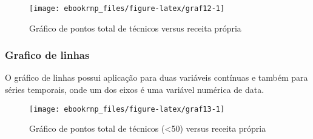 \documentclass[12pt,]{style/krantz}
\makeatletter
\newenvironment{Shaded}{\begin{snugshade}}{\end{snugshade}}
\newcommand{\KeywordTok}[1]{\textcolor[rgb]{0.13,0.29,0.53}{\textbf{#1}}}
\newcommand{\DataTypeTok}[1]{\textcolor[rgb]{0.13,0.29,0.53}{#1}}
\newcommand{\DecValTok}[1]{\textcolor[rgb]{0.00,0.00,0.81}{#1}}
\newcommand{\StringTok}[1]{\textcolor[rgb]{0.31,0.60,0.02}{#1}}
\newcommand{\OperatorTok}[1]{\textcolor[rgb]{0.81,0.36,0.00}{\textbf{#1}}}
\newcommand{\NormalTok}[1]{#1}
\newenvironment{kframe}{%
\medskip{}
\setlength{\fboxsep}{.8em}
 \def\at@end@of@kframe{}%
 \ifinner\ifhmode%
  \def\at@end@of@kframe{\end{minipage}}%
  \begin{minipage}{\columnwidth}%
 \fi\fi%
 \def\FrameCommand##1{\hskip\@totalleftmargin \hskip-\fboxsep
 \colorbox{shadecolor}{##1}\hskip-\fboxsep
     \hskip-\linewidth \hskip-\@totalleftmargin \hskip\columnwidth}%
 \MakeFramed {\advance\hsize-\width
   \@totalleftmargin\z@ \linewidth\hsize
   \@setminipage}}%
 {\par\unskip\endMakeFramed%
 \at@end@of@kframe}
\renewenvironment{Shaded}{\begin{kframe}}{\end{kframe}}
\theoremstyle{definition}
\theoremstyle{definition}
\theoremstyle{definition}
\theoremstyle{remark}
\makeatother
\begin{document}
\begin{figure}[H]

{\centering \texttt{[image: ebookrnp\_files/figure-latex/graf12-1]} 

}

\caption{Gráfico de pontos total de técnicos versus receita própria}\label{fig:graf12}
\end{figure}

\subsubsection{Grafico de linhas}\label{grafico-de-linhas}

O gráfico de linhas possui aplicação para duas variáveis contínuas e
também para séries temporais, onde um dos eixos é uma variável numérica
de data.

\begin{Shaded}
\end{Shaded}

\begin{figure}[H]

{\centering \texttt{[image: ebookrnp\_files/figure-latex/graf13-1]} 

}

\caption{Gráfico de pontos total de técnicos (<50) versus receita própria}\label{fig:graf13}
\end{figure}
\end{document}
